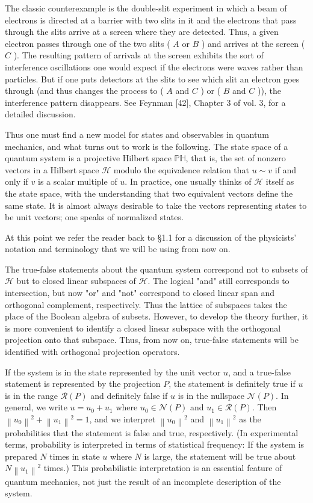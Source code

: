 \documentclass[10pt, letterpaper]{article}
\begin{document}
The classic counterexample is the double-slit experiment in which a beam of electrons is directed at a barrier with two slits in it and the electrons that pass through the slits arrive at a screen where they are detected. Thus, a given electron passes through one of the two slits ( $A$ or $B$ ) and arrives at the screen ( $C$ ). The resulting pattern of arrivals at the screen exhibits the sort of interference oscillations one would expect if the electrons were waves rather than particles. But if one puts detectors at the slits to see which slit an electron goes through (and thus changes the process to ( $A$ and $C$ ) or ( $B$ and $C$ )), the interference pattern disappears. See Feynman [42], Chapter 3 of vol. 3, for a detailed discussion.

Thus one must find a new model for states and observables in quantum mechanics, and what turns out to work is the following. The state space of a quantum system is a projective Hilbert space $\mathbb{P H}$, that is, the set of nonzero vectors in a Hilbert space $\mathcal{H}$ modulo the equivalence relation that $u \sim v$ if and only if $v$ is a scalar multiple of $u$. In practice, one usually thinks of $\mathcal{H}$ itself as the state space, with the understanding that two equivalent vectors define the same state. It is almost always desirable to take the vectors representing states to be unit vectors; one speaks of normalized states.

At this point we refer the reader back to §1.1 for a discussion of the physicists' notation and terminology that we will be using from now on.

The true-false statements about the quantum system correspond not to subsets of $\mathcal{H}$ but to closed linear subspaces of $\mathcal{H}$. The logical "and" still corresponds to intersection, but now "or" and "not" correspond to closed linear span and orthogonal complement, respectively. Thus the lattice of subspaces takes the place of the Boolean algebra of subsets. However, to develop the theory further, it is more convenient to identify a closed linear subspace with the orthogonal projection onto that subspace. Thus, from now on, true-false statements will be identified with orthogonal projection operators.

If the system is in the state represented by the unit vector $u$, and a true-false statement is represented by the projection $P$, the statement is definitely true if $u$ is in the range $\mathcal{R}(P)$ and definitely false if $u$ is in the nullspace $\mathcal{N}(P)$. In general, we write $u=u_{0}+u_{1}$ where $u_{0} \in \mathcal{N}(P)$ and $u_{1} \in \mathcal{R}(P)$. Then $\left\|u_{0}\right\|^{2}+\left\|u_{1}\right\|^{2}=1$, and we interpret $\left\|u_{0}\right\|^{2}$ and $\left\|u_{1}\right\|^{2}$ as the probabilities that the statement is false and true, respectively. (In experimental terms, probability is interpreted in terms of statistical frequency: If the system is prepared $N$ times in state $u$ where $N$ is large, the statement will be true about $N\left\|u_{1}\right\|^{2}$ times.) This probabilistic interpretation is an essential feature of quantum mechanics, not just the result of an incomplete description of the system.
\end{document}
